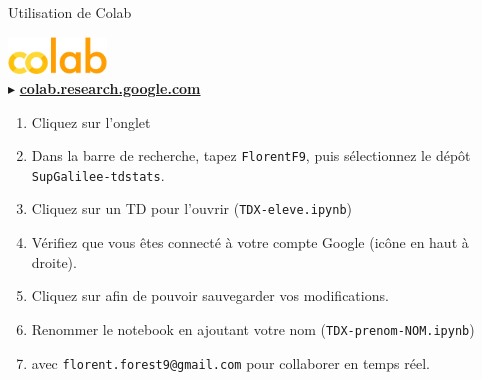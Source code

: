 \documentclass{beamer}
\begin{document}
  \begin{frame}{Utilisation de Colab}

    \begin{center}
      \includegraphics[height=1cm]{./rc/colab.png}\\
      $\blacktriangleright$ \textbf{\href{https://colab.research.google.com}{colab.research.google.com}}
    \end{center}

    \begin{enumerate}
      \item Cliquez sur l'onglet 
      \item Dans la barre de recherche, tapez \texttt{FlorentF9}, puis sélectionnez le dépôt \texttt{SupGalilee-tdstats}.
      \item Cliquez sur un TD pour l'ouvrir (\texttt{TDX-eleve.ipynb})
      \item Vérifiez que vous êtes connecté à votre compte Google (icône en haut à droite).
      \item Cliquez sur  afin de pouvoir sauvegarder vos modifications.
      \item Renommer le notebook en ajoutant votre nom (\texttt{TDX-prenom-NOM.ipynb})
      \item {} avec \texttt{florent.forest9@gmail.com} pour collaborer en temps réel.
    \end{enumerate}

  \end{frame}
\end{document}
